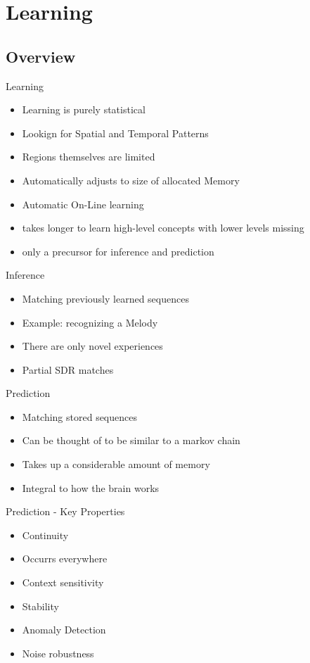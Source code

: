 \section{Learning}

\subsection{Overview}

\begin{frame}[c]{Learning}
    \begin{itemize}[<+(1)->]
        \item Learning is purely statistical
        \item Lookign for Spatial and Temporal Patterns
        \item Regions themselves are limited
        \item Automatically adjusts to size of allocated Memory
        \item Automatic On-Line learning
        \item takes longer to learn high-level concepts with lower levels missing
        \item only a precursor for inference and prediction
    \end{itemize}
\end{frame}


\begin{frame}[c]{Inference}
    \Large
    \begin{itemize}[<+(1)->]
        \item Matching previously learned sequences
        \item Example: recognizing a Melody
        \item There are only novel experiences
        \item Partial SDR matches
    \end{itemize}
\end{frame}


\begin{frame}[c]{Prediction}
    \Large
    \begin{itemize}[<+(1)->]
        \item Matching stored sequences
        \item Can be thought of to be similar to a markov chain
        \item Takes up a considerable amount of memory
        \item Integral to how the brain works
    \end{itemize}
\end{frame}


\begin{frame}[c]{Prediction - Key Properties}
    \Large
    \begin{itemize}[<+(1)->]
        \item Continuity
        \item Occurrs everywhere
        \item Context sensitivity
        \item Stability
        \item Anomaly Detection
        \item Noise robustness
    \end{itemize}
\end{frame}




